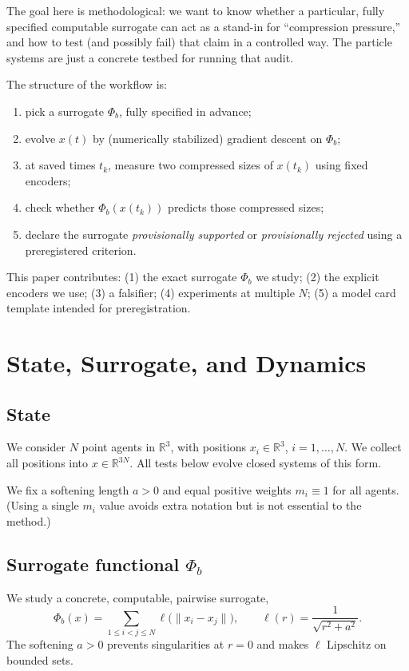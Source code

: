 \documentclass[11pt,a4paper]{article}
\numberwithin{equation}{section}
\newcommand{\R}{\mathbb{R}}
\newcommand{\norm}[1]{\lVert #1\rVert}
\newcommand{\phib}{\Phi_b}
\begin{document}
\medskip
The goal here is methodological: we want to know whether a particular, fully specified computable surrogate can act as a stand-in for “compression pressure,” and how to test (and possibly fail) that claim in a controlled way. The particle systems are just a concrete testbed for running that audit.

The structure of the workflow is:
\begin{enumerate}[label=(\roman*)]
\item pick a surrogate $\phib$, fully specified in advance;
\item evolve $x(t)$ by (numerically stabilized) gradient descent on $\phib$;
\item at saved times $t_k$, measure two compressed sizes of $x(t_k)$ using fixed encoders;
\item check whether $\phib(x(t_k))$ predicts those compressed sizes;
\item declare the surrogate \emph{provisionally supported} or \emph{provisionally rejected} using a preregistered criterion.
\end{enumerate}

This paper contributes: (1) the exact surrogate $\phib$ we study; (2) the explicit encoders we use; (3) a falsifier; (4) experiments at multiple $N$; (5) a model card template intended for preregistration.

\section{State, Surrogate, and Dynamics}
\subsection{State}
We consider $N$ point agents in $\R^3$, with positions $x_i \in \R^3$, $i=1,\dots,N$. We collect all positions into $x \in \R^{3N}$. All tests below evolve closed systems of this form.

We fix a softening length $a>0$ and equal positive weights $m_i \equiv 1$ for all agents. (Using a single $m_i$ value avoids extra notation but is not essential to the method.)

\subsection{Surrogate functional $\phib$}
We study a concrete, computable, pairwise surrogate,
\begin{equation}
\label{eq:phib-def}
\phib(x)
= \sum_{1 \le i < j \le N} \ell\!\big( \norm{x_i - x_j} \big),
\qquad
\ell(r) = \frac{1}{\sqrt{r^2 + a^2}}.
\end{equation}
The softening $a>0$ prevents singularities at $r{=}0$ and makes $\ell$ Lipschitz on bounded sets.
\end{document}

